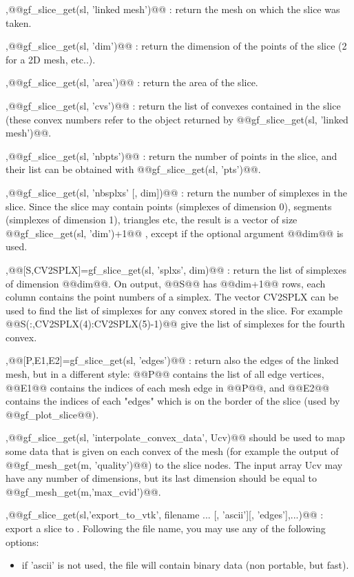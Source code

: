 \begin{cmddescription}
  \sep{@@gf_slice_get(sl, 'linked mesh')@@} : return the mesh on which the slice was taken.
  
  \sep{@@gf_slice_get(sl, 'dim')@@} : return the dimension of the points of the slice (2 for a 2D mesh, etc..).

  \sep{@@gf_slice_get(sl, 'area')@@} : return the area of the slice.
  
  \sep{@@gf_slice_get(sl, 'cvs')@@} : return the list of convexes contained
  in the slice (these convex numbers refer to the \tmesh object
  returned by @@gf_slice_get(sl, 'linked mesh')@@.

  \sep{@@gf_slice_get(sl, 'nbpts')@@} : return the number of points in the slice, and their list can be obtained with
  @@gf_slice_get(sl, 'pts')@@.

  \sep{@@gf_slice_get(sl, 'nbsplxs' [, dim])@@} : return the number of simplexes in the slice. Since the slice may
  contain points (simplexes of dimension 0), segments (simplexes of
  dimension 1), triangles etc, the result is a vector of size
  @@gf_slice_get(sl, 'dim')+1@@ , except if the optional argument @@dim@@ is
  used.

  \sep{@@[S,CV2SPLX]=gf_slice_get(sl, 'splxs', dim)@@} : return the
  list of simplexes of dimension @@dim@@. On output, @@S@@ has
  @@dim+1@@ rows, each column contains the point numbers of a simplex.
  The vector CV2SPLX can be used to find the list of simplexes for any
  convex stored in the slice. For example
  @@S(:,CV2SPLX(4):CV2SPLX(5)-1)@@ give the list of simplexes for the
  fourth convex.

  \sep{@@[P,E1,E2]=gf_slice_get(sl, 'edges')@@} : return also the
  edges of the linked mesh, but in a different style: @@P@@ contains
  the list of all edge vertices, @@E1@@ contains the indices of each
  mesh edge in @@P@@, and @@E2@@ contains the indices of each "edges"
  which is on the border of the slice (used by @@gf_plot_slice@@).


  \sep{@@gf_slice_get(sl, 'interpolate_convex_data', Ucv)@@}  
  should be used to map some data that is given on each convex of the
  mesh (for example the output of @@gf\_mesh\_get(m, 'quality')@@) to
  the slice nodes. The input array Ucv may have any number of
  dimensions, but its last dimension should be equal to
  @@gf\_mesh\_get(m,'max_cvid')@@.

  \sep{@@gf_slice_get(sl,'export_to_vtk', filename ... [, 'ascii'][,
    'edges'],...)@@} : export a slice to \VTK.  Following the file
  name, you may use any of the following options:
  \begin{itemize}
  \item if 'ascii' is not used, the file will contain binary
    data (non portable, but fast).
    

\end{itemize}
\end{cmddescription}
